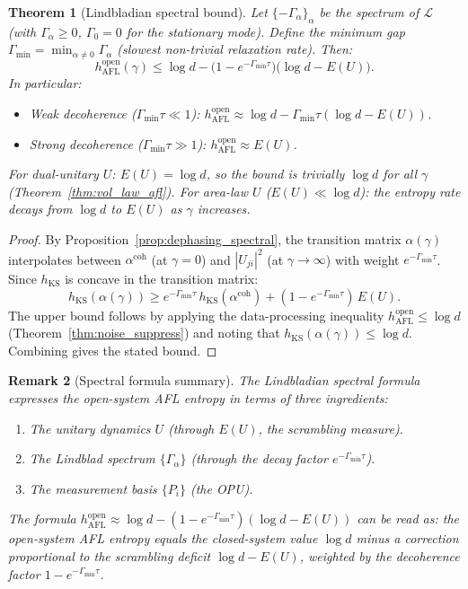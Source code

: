 \documentclass[12pt,a4paper]{article}
\newtheorem{theorem}{Theorem}[section]
\newtheorem{remark}[theorem]{Remark}
\begin{document}
\begin{theorem}[Lindbladian spectral bound]
\label{thm:lind_spectral_bound}
Let $\{-\Gamma_\alpha\}_\alpha$ be the spectrum of $\mathcal{L}$ (with
$\Gamma_\alpha \geq 0$, $\Gamma_0 = 0$ for the stationary mode).
Define the \emph{minimum gap} $\Gamma_{\min} = \min_{\alpha\neq 0}\Gamma_\alpha$
(slowest non-trivial relaxation rate).  Then:
\[
  h_{\mathrm{AFL}}^{\mathrm{open}}(\gamma)
  \leq \log d
  - \bigl(1 - e^{-\Gamma_{\min}\tau}\bigr)
    \bigl(\log d - E(U)\bigr).
\]
In particular:
\begin{itemize}
\item Weak decoherence ($\Gamma_{\min}\tau \ll 1$):
  $h_{\mathrm{AFL}}^{\mathrm{open}} \approx \log d - \Gamma_{\min}\tau(\log d - E(U))$.
\item Strong decoherence ($\Gamma_{\min}\tau \gg 1$):
  $h_{\mathrm{AFL}}^{\mathrm{open}} \approx E(U)$.
\end{itemize}
For dual-unitary $U$: $E(U) = \log d$, so the bound is trivially $\log d$
for all $\gamma$ (Theorem~\ref{thm:vol_law_afl}).
For area-law $U$ ($E(U) \ll \log d$): the entropy rate decays from $\log d$
to $E(U)$ as $\gamma$ increases.
\end{theorem}
\begin{proof}
By Proposition~\ref{prop:dephasing_spectral}, the transition matrix
$\alpha(\gamma)$ interpolates between $\alpha^{\mathrm{coh}}$ (at $\gamma=0$)
and $|U_{ji}|^2$ (at $\gamma\to\infty$) with weight $e^{-\Gamma_{\min}\tau}$.
Since $h_{\mathrm{KS}}$ is concave in the transition matrix:
\[
  h_{\mathrm{KS}}(\alpha(\gamma))
  \geq e^{-\Gamma_{\min}\tau}\,h_{\mathrm{KS}}(\alpha^{\mathrm{coh}})
     + (1-e^{-\Gamma_{\min}\tau})\,E(U).
\]
The upper bound follows by applying the data-processing inequality
$h_{\mathrm{AFL}}^{\mathrm{open}} \leq \log d$ (Theorem~\ref{thm:noise_suppress})
and noting that $h_{\mathrm{KS}}(\alpha(\gamma)) \leq \log d$.
Combining gives the stated bound.
\end{proof}

\begin{remark}[Spectral formula summary]
The Lindbladian spectral formula expresses the open-system AFL entropy in
terms of three ingredients:
\begin{enumerate}
\item The \emph{unitary dynamics} $U$ (through $E(U)$, the scrambling measure).
\item The \emph{Lindblad spectrum} $\{\Gamma_\alpha\}$ (through the decay factor $e^{-\Gamma_{\min}\tau}$).
\item The \emph{measurement basis} $\{P_i\}$ (the OPU).
\end{enumerate}
The formula $h_{\mathrm{AFL}}^{\mathrm{open}} \approx \log d - (1-e^{-\Gamma_{\min}\tau})(\log d - E(U))$
can be read as: the open-system AFL entropy equals the closed-system value
$\log d$ minus a correction proportional to the scrambling deficit $\log d - E(U)$,
weighted by the decoherence factor $1 - e^{-\Gamma_{\min}\tau}$.
\end{remark}
\end{document}

